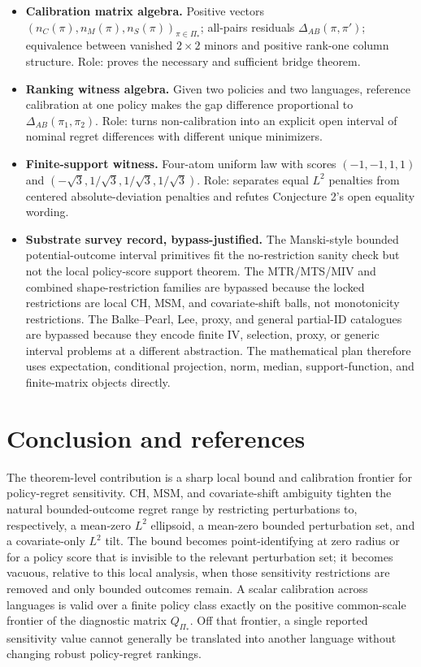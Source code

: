 \documentclass[11pt]{article}
\theoremstyle{definition}
\theoremstyle{plain}
\theoremstyle{remark}
\begin{document}
\begin{itemize}[leftmargin=*]
\item \textbf{Calibration matrix algebra.}  Positive vectors
$(n_C(\pi),n_M(\pi),n_S(\pi))_{\pi\in\Pi_\ast}$; all-pairs residuals
$\Delta_{AB}(\pi,\pi')$; equivalence between vanished $2\times2$ minors and positive
rank-one column structure.  Role: proves the necessary and sufficient bridge theorem.

\item \textbf{Ranking witness algebra.}  Given two policies and two languages, reference
calibration at one policy makes the gap difference proportional to
$\Delta_{AB}(\pi_1,\pi_2)$.  Role: turns non-calibration into an explicit open interval
of nominal regret differences with different unique minimizers.

\item \textbf{Finite-support witness.}  Four-atom uniform law with scores
$(-1,-1,1,1)$ and $(-\sqrt3,1/\sqrt3,1/\sqrt3,1/\sqrt3)$.  Role: separates equal
$L^2$ penalties from centered absolute-deviation penalties and refutes Conjecture 2's
open equality wording.

\item \textbf{Substrate survey record, bypass-justified.}  The Manski-style bounded
potential-outcome interval primitives fit the no-restriction sanity check but not the
local policy-score support theorem.  The MTR/MTS/MIV and combined shape-restriction
families are bypassed because the locked restrictions are local CH, MSM, and
covariate-shift balls, not monotonicity restrictions.  The Balke--Pearl, Lee, proxy,
and general partial-ID catalogues are bypassed because they encode finite IV,
selection, proxy, or generic interval problems at a different abstraction.  The
mathematical plan therefore uses expectation, conditional projection, norm, median,
support-function, and finite-matrix objects directly.
\end{itemize}

\section{Conclusion and references}
The theorem-level contribution is a sharp local bound and calibration frontier for
policy-regret sensitivity.  CH, MSM, and covariate-shift ambiguity tighten the natural
bounded-outcome regret range by restricting perturbations to, respectively, a mean-zero
$L^2$ ellipsoid, a mean-zero bounded perturbation set, and a covariate-only $L^2$
tilt.  The bound becomes point-identifying at zero radius or for a policy score that is
invisible to the relevant perturbation set; it becomes vacuous, relative to this local
analysis, when those sensitivity restrictions are removed and only bounded outcomes
remain.  A scalar calibration across languages is valid over a finite policy class
exactly on the positive common-scale frontier of the diagnostic matrix $Q_{\Pi_\ast}$.
Off that frontier, a single reported sensitivity value cannot generally be translated
into another language without changing robust policy-regret rankings.
\end{document}
